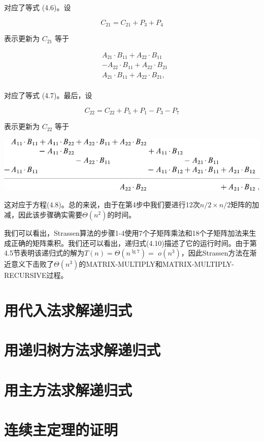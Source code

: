 \documentclass[lang=cn,newtx,10pt,scheme=chinese]{elegantbook}
\begin{document}
对应了等式 (4.6)。设

$$
C_{21}=C_{21}+P_3+P_4
$$

表示更新为 $C_{21}$ 等于

$$
\begin{aligned}
& A_{21} \cdot B_{11}+A_{22} \cdot B_{11} \\
& -A_{22} \cdot B_{11}+A_{22} \cdot B_{21} \\
& A_{21} \cdot B_{11}+A_{22} \cdot B_{21} \text {, } \\
&
\end{aligned}
$$

对应了等式 (4.7)。最后，设

$$
C_{22}=C_{22}+P_5+P_1-P_3-P_7
$$

表示更新为 $C_{22}$ 等于

\includegraphics{算法导论第四版插图/第四章/斯特拉森公式2.pdf}

这对应于方程(4.8)。总的来说，由于在第4步中我们要进行12次$n/2\times n/2$矩阵的加减，因此该步骤确实需要$\Theta\left(n^2\right)$的时间。

我们可以看出，Strassen算法的步骤1-4使用7个子矩阵乘法和18个子矩阵加法来生成正确的矩阵乘积。我们还可以看出，递归式(4.10)描述了它的运行时间。由于第4.5节表明该递归式的解为$T(n)=\Theta\left(n^{\lg 7}\right)=$ $o\left(n^3\right)$，因此Strassen方法在渐近意义下击败了$\Theta\left(n^3\right)$的MATRIX-MULTIPLY和MATRIX-MULTIPLY-RECURSIVE过程。


\section{用代入法求解递归式}

\section{用递归树方法求解递归式}

\section{用主方法求解递归式}

\section{连续主定理的证明}
\end{document}
